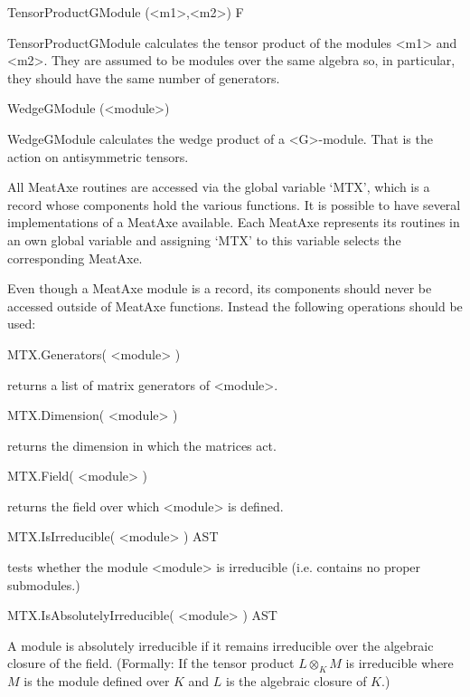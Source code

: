 \>TensorProductGModule (<m1>,<m2>) F

TensorProductGModule calculates the tensor product of the modules
<m1> and <m2>. 
They are assumed to be modules over the same algebra so, in particular,
they  should have the same number of generators.

\>WedgeGModule (<module>)

WedgeGModule calculates the wedge product of a <G>-module.
That is the action on antisymmetric tensors.



All MeatAxe routines are accessed via the global variable `MTX', which is a
record whose components hold the various functions. It is possible to have
several implementations of a MeatAxe available. Each MeatAxe represents its
routines in an own global variable and assigning `MTX' to this variable
selects the corresponding MeatAxe.


Even though a MeatAxe module is a record, its components should never be
accessed outside of MeatAxe functions. Instead the following operations
should be used:

\>MTX.Generators( <module> )

returns a list of matrix generators of <module>.

\>MTX.Dimension( <module> )

returns the dimension in which the matrices act.

\>MTX.Field( <module> )

returns the field over which <module> is defined.


\>MTX.IsIrreducible( <module> ) AST

tests whether the module <module> is irreducible (i.e. contains no proper
submodules.)

\>MTX.IsAbsolutelyIrreducible( <module> ) AST

A module is absolutely irreducible if it remains irreducible over the
algebraic closure of the field. (Formally: If the tensor product $L\otimes_K
M$ is irreducible where $M$ is the module defined over $K$ and $L$ is the
algebraic closure of $K$.)

